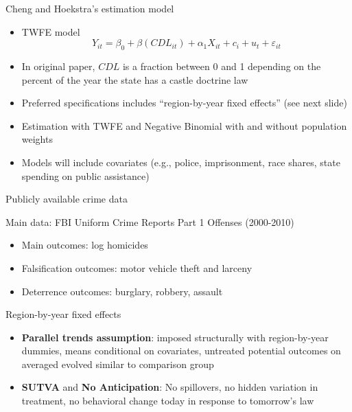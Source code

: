 \documentclass{beamer}
\begin{document}
\begin{frame}{Cheng and Hoekstra's estimation model}
	
	\begin{itemize}
	\item TWFE model$$Y_{it} =  \beta_0 + \beta (CDL_{it}) + \alpha_1X_{it} + c_i + u_t + \varepsilon_{it}$$
	\item In original paper, $CDL$ is a fraction between 0 and 1 depending on the percent of the year the state has a castle doctrine law 
	\item Preferred specifications includes ``region-by-year fixed effects'' (see next slide)
	\item Estimation with TWFE and Negative Binomial with and without population weights
	\item Models will include covariates (e.g., police, imprisonment, race shares, state spending on public assistance)
	\end{itemize}
\end{frame}


\begin{frame}{Publicly available crime data}
	
Main data: FBI Uniform Crime Reports Part 1 Offenses (2000-2010)
		\begin{itemize}
		\item Main outcomes: log homicides
		\item Falsification outcomes: motor vehicle theft and larceny
		\item Deterrence outcomes: burglary, robbery, assault
		\end{itemize}
\end{frame}



\begin{frame}{Region-by-year fixed effects}
	
	\begin{itemize}
	\item \textbf{Parallel trends assumption}: imposed structurally with region-by-year dummies, means conditional on covariates, untreated potential outcomes on averaged evolved similar to comparison group
	\item \textbf{SUTVA} and \textbf{No Anticipation}: No spillovers, no hidden variation in treatment, no behavioral change today in response to tomorrow's law
	\end{itemize}
\end{frame}
\end{document}
